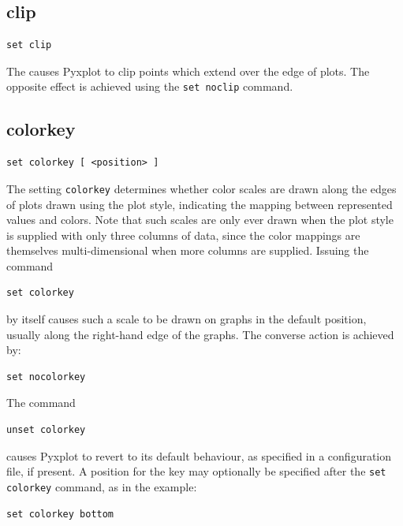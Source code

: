 \subsection{clip}

\begin{verbatim}
set clip
\end{verbatim}

The  causes Pyxplot to clip points which extend over the edge
of plots. The opposite effect is achieved using the {\tt set noclip}
command.


\subsection{colorkey}

\begin{verbatim}
set colorkey [ <position> ]
\end{verbatim}

The setting {\tt colorkey} determines whether color scales are drawn along
the edges of plots drawn using the  plot style, indicating
the mapping between represented values and colors. Note that such scales are
only ever drawn when the  plot style is supplied with only
three columns of data, since the color mappings are themselves
multi-dimensional when more columns are supplied. Issuing the command

\begin{verbatim}
set colorkey
\end{verbatim}

\noindent by itself causes such a scale to be drawn on graphs in the default
position, usually along the right-hand edge of the graphs. The converse action
is achieved by:

\begin{verbatim}
set nocolorkey
\end{verbatim}

\noindent The command

\begin{verbatim}
unset colorkey
\end{verbatim}

\noindent causes Pyxplot to revert to its default behaviour, as specified in a
configuration file, if present. A position for the key may optionally be
specified after the {\tt set colorkey} command, as in the example:

\begin{verbatim}
set colorkey bottom
\end{verbatim}

